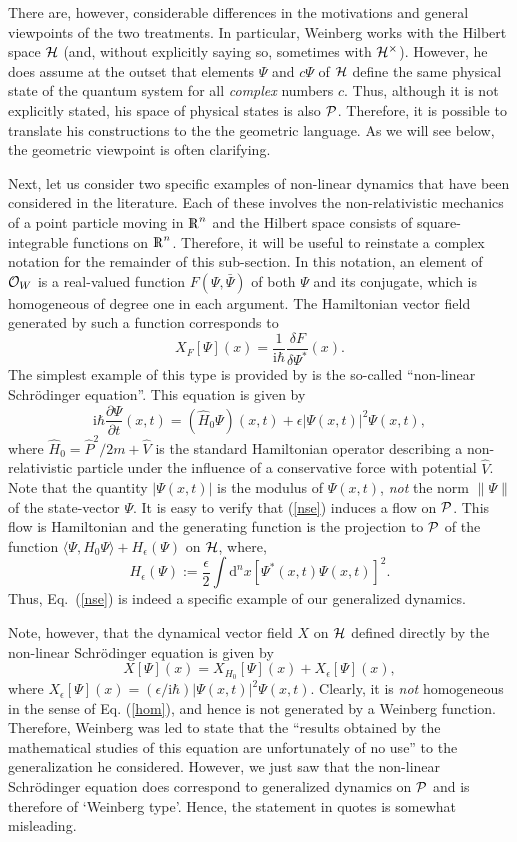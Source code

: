 \documentclass[12pt,aps,eqsecnum,tighten]{revtex4-2}
\def\be{\begin{equation}}
\def\ee{\end{equation}}
\def\<{\langle}
\def\>{\rangle}
\def\d{{\mathrm d}}
\def\i{\mathrm{i}}
\def\H{{\cal H}}
\def\punctH{{\cal H}^{\times}}
\def\P{{\cal P}}
\newcommand{\hvf}[1]{{X_{#1}}}
\def\Rl{{\mathchoice 
{\setbox0=\hbox{$\displaystyle\rm R$}\hbox{\hbox to0pt
{\kern0.4\wd0\vrule height0.9\ht0\hss}\box0}}
{\setbox0=\hbox{$\textstyle\rm R$}\hbox{\hbox to0pt
{\kern0.4\wd0\vrule height0.9\ht0\hss}\box0}}
{\setbox0=\hbox{$\scriptstyle\rm R$}\hbox{\hbox to0pt
{\kern0.4\wd0\vrule height0.9\ht0\hss}\box0}}
{\setbox0=\hbox{$\scriptscriptstyle\rm R$}\hbox{\hbox to0pt
{\kern0.4\wd0\vrule height0.9\ht0\hss}\box0}}}}
\def\Rl{{\mathchoice
{\setbox0=\hbox{$\displaystyle\rm R$}\hbox{\hbox to0pt
{\kern0.4\wd0\vrule height0.9\ht0\hss}\box0}}
{\setbox0=\hbox{$\textstyle\rm R$}\hbox{\hbox to0pt
{\kern0.4\wd0\vrule height0.9\ht0\hss}\box0}}
{\setbox0=\hbox{$\scriptstyle\rm R$}\hbox{\hbox to0pt
{\kern0.4\wd0\vrule height0.9\ht0\hss}\box0}}
{\setbox0=\hbox{$\scriptscriptstyle\rm R$}\hbox{\hbox to0pt
{\kern0.4\wd0\vrule height0.9\ht0\hss}\box0}}}}
\def\R{\Rl}
\begin{document}
There are, however, considerable differences in the motivations and
general viewpoints of the two treatments. In particular, Weinberg
works with the Hilbert space $\H$ (and, without explicitly saying so,
sometimes with $\punctH$). However, he does assume at the outset that
elements $\Psi$ and $c\Psi$ of $\H$ define the same physical state of
the quantum system for all {\it complex} numbers $c$. Thus, although
it is not explicitly stated, his space of physical states is also
$\P$.  Therefore, it is possible to translate his constructions to the
the geometric language. As we will see below, the geometric viewpoint
is often clarifying.

Next, let us consider two specific examples of non-linear dynamics
that have been considered in the literature.  Each of these involves
the non-relativistic mechanics of a point particle moving in $\R^n$
and the Hilbert space consists of square-integrable functions on
$\R^n$. Therefore, it will be useful to reinstate a complex notation
for the remainder of this sub-section.  In this notation, an element
of ${\cal O}_W$ is a real-valued function $F(\Psi, \bar{\Psi})$ of
both $\Psi$ and its conjugate, which is homogeneous of degree one in
each argument. The Hamiltonian vector field generated by such a
function corresponds to
%
\be 
\hvf{F}[\Psi](x) = \frac{1}{\i\hbar} \frac{\delta
F}{\delta \Psi^*} ( x ).  
\ee
%
The simplest example of this type is provided by is the so-called
``non-linear Schr\"odinger equation''.  This equation is given by
%
\be \label{nse}
\i\hbar \frac{\partial \Psi}{\partial t}(x,t) = 
(\hat{H}_0 \Psi)(x,t) + \epsilon | \Psi(x,t) |^2 \Psi(x,t),
\ee
%
where $\hat{H}_0 = \hat{P}^2/2m + \hat{V}$ is the standard Hamiltonian
operator describing a non-relativistic particle under the influence of
a conservative force with potential $\hat{V}$.  Note that the quantity
$| \Psi(x,t) | $ is the modulus of $\Psi(x,t)$, {\em not} the norm
$\|\Psi\|$ of the state-vector $\Psi$. It is easy to verify that
(\ref{nse}) induces a flow on $\P$. This flow is Hamiltonian and the
generating function is the projection to $\P$ of the function
$\<\Psi, H_0\Psi\> + H_\epsilon(\Psi)$ on $\H$, where,
%
\be
 H_\epsilon(\Psi) := \frac{\epsilon}{2}\int \d^n \! x
\left[ \Psi^*(x,t) \Psi(x,t) \right]^2.
\ee
%
Thus, Eq.~(\ref{nse}) is indeed a specific example of our generalized
dynamics.

Note, however, that the dynamical vector field $X$ on $\H$ defined
directly by the non-linear Schr\"odinger equation is given by
%
\be X[\Psi](x) = \hvf{H_0}[\Psi](x) + X_\epsilon[\Psi](x), 
\ee 
%
where $X_\epsilon[\Psi](x) = (\epsilon/\i\hbar) |\Psi(x,t)|^2
\Psi(x,t)$. Clearly, it is {\it not} homogeneous in the sense of
Eq. (\ref{hom}), and hence is not generated by a Weinberg function.
Therefore, Weinberg was led to state that the ``results obtained by
the mathematical studies of this equation are unfortunately of no
use'' to the generalization he considered. However, we just saw that
the non-linear Schr\"odinger equation does correspond to generalized
dynamics on $\P$ and is therefore of `Weinberg type'. Hence, the
statement in quotes is somewhat misleading.
\end{document}
